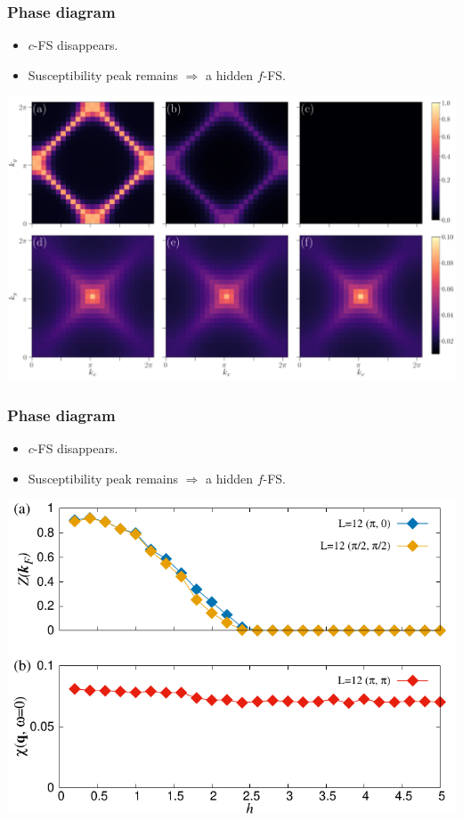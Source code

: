 \documentclass[xcolor=table, 10pt, aspectratio=43]{beamer}
\begin{document}
\begin{frame}
\frametitle{Phase diagram}
\begin{itemize}
\item $c$-FS disappears.
\item Susceptibility peak remains $\Rightarrow$ a hidden $f$-FS.
\end{itemize}
\begin{center}
	\includegraphics[width=\textwidth]{fig2}
\end{center}
\end{frame}

\begin{frame}
\frametitle{Phase diagram}
\begin{itemize}
\item $c$-FS disappears.
\item Susceptibility peak remains $\Rightarrow$ a hidden $f$-FS.
\end{itemize}
\begin{center}
	\includegraphics[width=.8\textwidth]{fig4}
\end{center}
\end{frame}
\end{document}
